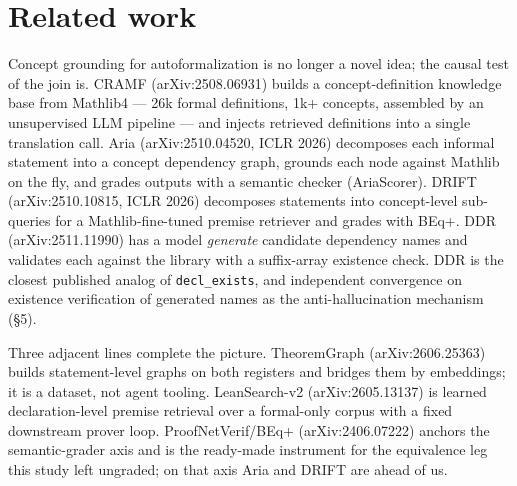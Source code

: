 \documentclass[10pt]{article}
\newcommand{\code}[1]{\texttt{#1}}
\begin{document}
\section{Related work}\label{sec:related}

Concept grounding for autoformalization is no longer a novel idea; the
causal test of the join is. CRAMF (arXiv:2508.06931) builds a
concept-definition knowledge base from Mathlib4 --- 26k formal
definitions, 1k+ concepts, assembled by an unsupervised LLM pipeline ---
and injects retrieved definitions into a single translation call. Aria
(arXiv:2510.04520, ICLR 2026) decomposes each informal statement into a
concept dependency graph, grounds each node against Mathlib on the fly,
and grades outputs with a semantic checker (AriaScorer). DRIFT
(arXiv:2510.10815, ICLR 2026) decomposes statements into concept-level
sub-queries for a Mathlib-fine-tuned premise retriever and grades with
BEq+. DDR (arXiv:2511.11990) has a model \emph{generate} candidate
dependency names and validates each against the library with a
suffix-array existence check. DDR is the closest published analog of
\code{decl\_exists}, and independent convergence on existence
verification of generated names as the anti-hallucination mechanism
(\S 5).

Three adjacent lines complete the picture. TheoremGraph
(arXiv:2606.25363) builds statement-level graphs on both registers and
bridges them by embeddings; it is a dataset, not agent tooling.
LeanSearch-v2 (arXiv:2605.13137) is learned declaration-level premise
retrieval over a formal-only corpus with a fixed downstream prover loop.
ProofNetVerif/BEq+ (arXiv:2406.07222) anchors the semantic-grader axis
and is the ready-made instrument for the equivalence leg this study left
ungraded; on that axis Aria and DRIFT are ahead of us.
\end{document}

